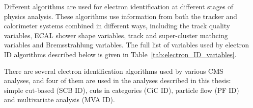 Different algorithms are used for electron identification at different stages of physics analysis. These algorithms use
information from both the tracker and calorimeter systems combined in different ways, including the track quality
variables, ECAL shower shape variables, track and super-cluster mathcing variables and Bremsstrahlung variables. The
full list of variables used by electron ID algorithms described below is given in Table~\ref{tab:electron_ID_variables}.


\newpage

\newpage


There are several electron identification algorithms used by various CMS analyses, and four of them are used in the
analyses described in this thesis: simple cut-based (SCB ID), cuts in categories (CiC ID), particle flow (PF ID) and
multivariate analysis (MVA ID).

